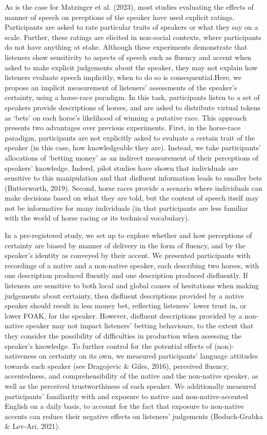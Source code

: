 \documentclass[
  man,floatsintext]{apa7}
\begin{document}
As is the case for Matzinger et al. (2023), most studies evaluating the effects of manner of speech on pereptions of the speaker have used explicit ratings. Participants are asked to rate particular traits of speakers or what they say on a scale. Further, these ratings are elicited in non-social contexts, where participants do not have anything at stake. Although these experiments demonstrate that listeners show sensitivity to aspects of speech such as fluency and accent when asked to make explicit judgements about the speaker, they may not explain how listeners evaluate speech implicitly, when to do so is consequential.Here, we propose an implicit measurement of listeners' assessments of the speaker's certainty, using a horse-race paradigm. In this task, participants listen to a set of speakers provide descriptions of horses, and are asked to distribute virtual tokens as `bets' on each horse's likelihood of winning a putative race. This approach presents two advantages over previous experiments. First, in the horse-race paradigm, participants are not explicitly asked to evaluate a certain trait of the speaker (in this case, how knowledgeable they are). Instead, we take participants' allocations of `betting money' as an indirect measurement of their perceptions of speakers' knowledge. Indeed, pilot studies have shown that individuals are sensitive to this manipulation and that disfluent information leads to smaller bets (Butterworth, 2019). Second, horse races provide a scenario where individuals can make decisions based on what they are told, but the content of speech itself may not be informative for many individuals (in that participants are less familiar with the world of horse racing or its technical vocabulary).

In a pre-registered study, we set up to explore whether and how perceptions of certainty are biased by manner of delivery in the form of fluency, and by the speaker's identity as conveyed by their accent. We presented participants with recordings of a native and a non-native speaker, each describing two horses, with one description produced fluently and one description produced disfluently. If listeners are sensitive to both local and global causes of hesitations when making judgements about certainty, then disfluent descriptions provided by a native speaker should result in less money bet, reflecting listeners' lower trust in, or lower FOAK, for the speaker. However, disfluent descriptions provided by a non-native speaker may not impact listeners' betting behaviours, to the extent that they consider the possibility of difficulties in production when assessing the speaker's knowledge. To further control for the potential effects of (non)-nativeness on certainty on its own, we measured participants' language attitudes towards each speaker (see Dragojevic \& Giles, 2016), perceived fluency, accentedness, and comprehensibility of the native and the non-native speaker, as well as the perceived trustworthiness of each speaker. We additionally measured participants' familiarity with and exposure to native and non-native-accented English on a daily basis, to account for the fact that exposure to non-native accents can reduce their negative effects on listeners' judgements (Boduch-Grabka \& Lev-Ari, 2021).
\end{document}
